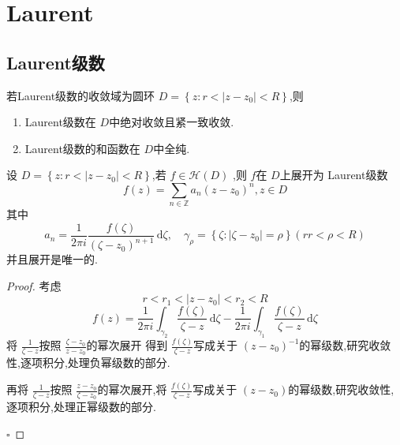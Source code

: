 \documentclass[../../复变函数.tex]{subfiles}
\begin{document}
\ifSubfilesClassLoaded{
    \frontmatter

    \tableofcontents
    
    \mainmatter
    \setcounter{chapter}{4}
}{}

\chapter{Laurent}

\section{Laurent级数}
\begin{theorem}
    若Laurent级数的收敛域为圆环 \(  D= \left\{ z:r< \left| z-z_0 \right|< R  \right\}  \),则
    \begin{enumerate}
        \item Laurent级数在 \(  D  \)中绝对收敛且紧一致收敛.  
        \item Laurent级数的和函数在 \(  D  \)中全纯. 
    \end{enumerate}
    
\end{theorem}

\begin{theorem}
    设 \(  D= \left\{ z:r< \left| z-z_0 \right|< R  \right\}  \),若 \(  f \in \mathcal{H}\left( D \right)   \)  ,则 \(  f  \)在 \(  D  \)上展开为 Laurent级数 \[
    f\left( z \right)= \sum _{n \in \mathbb{Z} }a_{n}\left( z-z_0 \right)^{n},z\in D  
    \]  其中 \[
    a_{n}= \frac{1 }{2\pi i } \frac{f\left( \zeta  \right)  }{ \left( \zeta -z_0 \right)^{n+ 1} }\,\mathrm{d} \zeta   ,\quad  \gamma _{\rho }= \left\{ \zeta :\left| \zeta -z_0 \right|= \rho   \right\}\left( rr< \rho < R \right) 
    \]并且展开是唯一的.
\end{theorem}
\begin{proof}
    考虑 \[
    r< r_1< \left| z-z_0 \right|< r_2< R 
    \] \[
    f\left( z \right)= \frac{1 }{2\pi i } \int_{ \gamma _2 }\frac{f\left( \zeta  \right)  }{\zeta -z }\,\mathrm{d} \zeta -\frac{1 }{2\pi i } \int_{ \gamma _1 }\frac{f\left( \zeta  \right)  }{ \zeta -z}\,\mathrm{d} \zeta      
    \]将 \(  \frac{1 }{\zeta -z }   \)按照 \(\frac{\zeta -z_0 }{z-z_0 }     \)的幂次展开 得到 \(  \frac{f\left( \zeta  \right)  }{\zeta -z }   \)写成关于 \(  \left( z-z_0 \right)^{-1}   \)的幂级数,研究收敛性,逐项积分,处理负幂级数的部分.

    再将 \(  \frac{1 }{\zeta -z }   \)按照 \(  \frac{z-z_0 }{\zeta -z_0 }   \)的幂次展开,将 \(  \frac{f\left( \zeta  \right)  }{\zeta -z }   \)写成关于 \(  \left( z-z_0 \right)   \)的幂级数,研究收敛性,逐项积分,处理正幂级数的部分.    

    \hfill $\square$
\end{proof}
\end{document}
